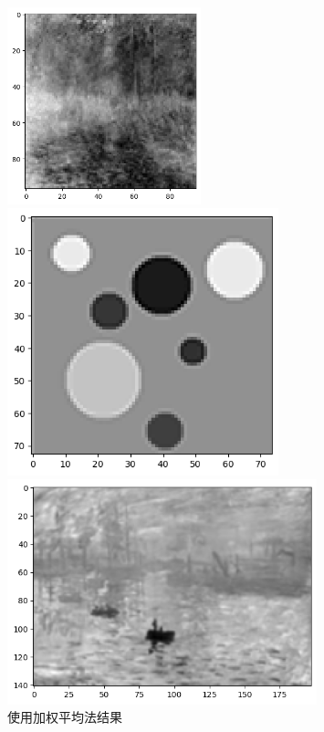 \documentclass{article}
\begin{document}
\begin{figure}[htbp]
	\centering
		\begin{minipage}[c]{0.3\textwidth} %
			\centering
			\includegraphics[width=0.5\textwidth]{output14.png} %
			
		\end{minipage}%
		\begin{minipage}[c]{0.2\textwidth}
			\centering
			\includegraphics[width=0.7\textwidth]{output15.png}
			
		\end{minipage}
		\begin{minipage}[c]{0.2\textwidth}
			\centering
			\includegraphics[width=0.8\textwidth]{output16.png}
			
		\end{minipage}
		\caption*{使用加权平均法结果}
\end{figure}
 \setcounter{section}{8}
\end{document}
